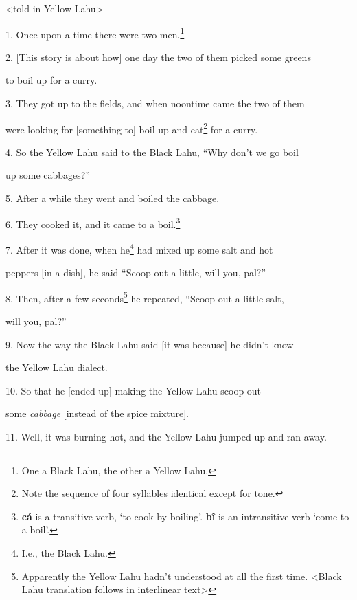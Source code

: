 \setcounter{footnote}{0}

<told in Yellow Lahu>

1. Once upon a time there were two men.\footnote{One a Black Lahu, the other a Yellow Lahu.}

2. [This story is about how] one day the two of them picked some greens

to boil up for a curry.

3. They got up to the fields, and when noontime came the two of them

were looking for [something to] boil up and eat\footnote{Note the sequence of four syllables identical except for tone.} for a curry.

4. So the Yellow Lahu said to the Black Lahu, ``Why don't we go boil

up some cabbages?''

5. After a while they went and boiled the cabbage.

6. They cooked it, and it came to a boil.\footnote{\textbf{cá} is a transitive verb, `to cook by boiling'. \textbf{bî} is an intransitive verb `come to a boil'.}

7. After it was done, when he\footnote{I.e., the Black Lahu.} had mixed up some salt and hot

peppers [in a dish], he said ``Scoop out a little, will you, pal?''

8. Then, after a few seconds\footnote{Apparently the Yellow Lahu hadn't understood at all the first time. <Black Lahu translation follows in interlinear text>} he repeated, ``Scoop out a little salt,

will you, pal?''

9. Now the way the Black Lahu said [it was because] he didn't know

the Yellow Lahu dialect.

10. So that he [ended up] making the Yellow Lahu scoop out

some \textit{cabbage }[instead of the spice mixture].

11. Well, it was burning hot, and the Yellow Lahu jumped up and ran away.

